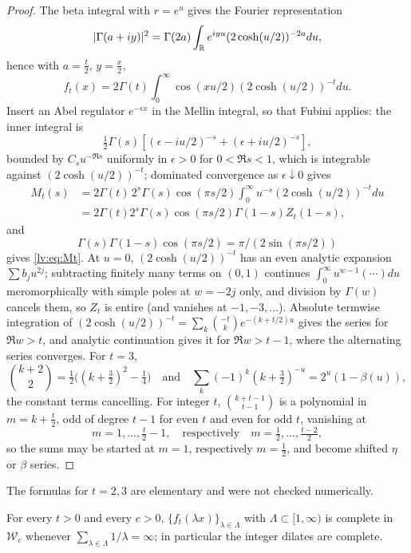 \begin{proof}
The beta integral with $r=\allowbreak e^u$ gives the Fourier representation
\[
|\Gamma(a+iy)|^2=\Gamma(2a)\int_{\mathbb{R}}e^{iyu}(2\cosh(u/2))^{-2a}du,
\]
hence with $a=\frac t2$, $y=\frac x2$,
\[
f_t(x)=2\Gamma(t)\int_0^\infty\cos(xu/2)(2\cosh(u/2))^{-t}du.
\]
Insert an Abel regulator $e^{-\epsilon x}$ in the Mellin integral, so that Fubini applies: the inner integral is
\[
\tfrac12\Gamma(s)[(\epsilon-iu/2)^{-s}+(\epsilon+iu/2)^{-s}],
\]
bounded by $C_su^{-\Re s}$ uniformly in $\epsilon>0$ for $0<\Re s<1$, which is integrable against $(2\cosh(u/2))^{-t}$; dominated convergence as $\epsilon\downarrow0$ gives
\begin{align*}
M_t(s)&=2\Gamma(t)\,2^s\Gamma(s)\cos(\pi s/2)\int_0^\infty u^{-s}(2\cosh(u/2))^{-t}du\\
&=2\Gamma(t)2^s\Gamma(s)\cos(\pi s/2)\Gamma(1-s)Z_t(1-s),
\end{align*}
and
\[
\Gamma(s)\Gamma(1-s)\cos(\pi s/2)=\pi/(2\sin(\pi s/2))
\]
gives \eqref{lv:eq:Mt}. At $u=\allowbreak 0$, $(2\cosh(u/2))^{-t}$ has an even analytic expansion $\sum b_ju^{2j}$; subtracting finitely many terms on $(0,1)$ continues $\int_0^\infty u^{w-1}(\cdots)du$ meromorphically with simple poles at $w=\allowbreak -2j$ only, and division by $\Gamma(w)$ cancels them, so $Z_t$ is entire (and vanishes at $-1,-3,\dots$). Absolute termwise integration of $(2\cosh(u/2))^{-t}=\allowbreak \sum_k\binom{-t}{k}e^{-(k+t/2)u}$ gives the series for $\Re w>t$, and analytic continuation gives it for $\Re w>t-1$, where the alternating series converges. For $t=\allowbreak 3$, 
\[
\binom{k+2}2=\tfrac12\bigl((k+\tfrac32)^2-\tfrac14\bigr)\quad\text{and}\quad\sum_k(-1)^k(k+\tfrac32)^{-u}=2^u(1-\beta(u)),
\]
the constant terms cancelling. For integer $t$, $\binom{k+t-1}{t-1}$ is a polynomial in $m=\allowbreak k+\frac t2$, odd of degree $t-1$ for even $t$ and even for odd $t$, vanishing at
\[
m=1,\dots,\tfrac t2-1,\quad\text{respectively}\quad m=\tfrac12,\dots,\tfrac{t-2}2,
\]
so the sums may be started at $m=1$, respectively $m=\frac12$, and become shifted $\eta$ or $\beta$ series.
\end{proof}

The formulas for $t=2,3$ are elementary and were not checked numerically.

\begin{corollary}\label{lv:cor:meixner}
For every $t>0$ and every $c>0$, $\{f_t(\lambda x)\}_{\lambda\in\Lambda}$ with $\Lambda\subset[1,\infty)$ is complete in $\mathcal W_c$ whenever $\sum_{\lambda\in\Lambda}1/\lambda=\infty$; in particular the integer dilates are complete.
\end{corollary}

